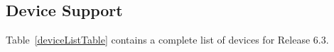 \documentclass[11pt,report,strict]{SANDreport}
\begin{document}
\subsection{Device Support}
Table~\ref{deviceListTable} contains a complete list of devices for \Xyce{}
Release 6.3.




\clearpage

\begin{SANDdistribution}[NM]%

    \bigskip



\end{SANDdistribution}
\end{document}

